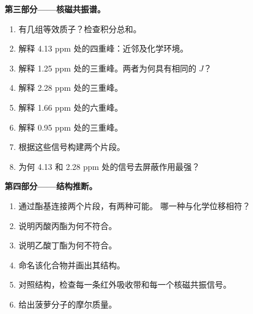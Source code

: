 \begin{problem}
\medskip
\noindent\textbf{第三部分——核磁共振谱。}
\begin{enumerate}[resume]
  \item 有几组等效质子？检查积分总和。
  \item 解释 4.13 ppm 处的四重峰：近邻及化学环境。
  \item 解释 1.25 ppm 处的三重峰。两者为何具有相同的
        $J$？
  \item 解释 2.28 ppm 处的三重峰。
  \item 解释 1.66 ppm 处的六重峰。
  \item 解释 0.95 ppm 处的三重峰。
  \item 根据这些信号构建两个片段。
  \item 为何 4.13 和 2.28 ppm 处的信号去屏蔽作用最强？
\end{enumerate}

\medskip
\noindent\textbf{第四部分——结构推断。}
\begin{enumerate}[resume]
  \item 通过酯基连接两个片段，有两种可能。
        哪一种与化学位移相符？
  \item 说明丙酸丙酯为何不符合。
  \item 说明乙酸丁酯为何不符合。
  \item 命名该化合物并画出其结构。
  \item 对照结构，检查每一条红外吸收带和每一个核磁共振信号。
  \item 给出菠萝分子的摩尔质量。
\end{enumerate}
\end{problem}

